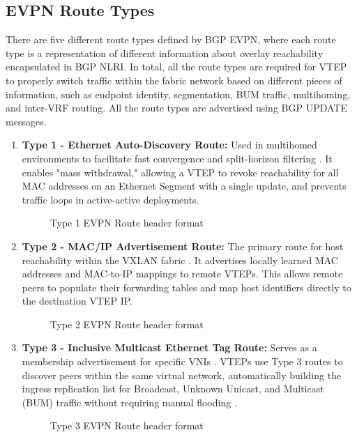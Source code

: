 \subsection{EVPN Route Types}
There are five different route types defined by BGP EVPN, where each route type is a representation of different information about overlay reachability encapsulated in BGP NLRI\cite{IETFRFC7365}. In total, all the route types are required for VTEP to properly switch traffic within the fabric network based on different pieces of information, such as endpoint identity, segmentation, BUM traffic, multihoming, and inter-VRF routing. All the route types are advertised using BGP UPDATE messages.

\begin{enumerate}
\item \textbf{Type 1 - Ethernet Auto-Discovery Route:}
Used in multihomed environments to facilitate fast convergence and split-horizon filtering \cite{IETFRFC7432}. It enables "mass withdrawal," allowing a VTEP to revoke reachability for all MAC addresses on an Ethernet Segment with a single update, and prevents traffic loops in active-active deployments.
\begin{figure}[!htbp]
\centering
\typeone
\caption{Type 1 EVPN Route header format}
\label{fig:type1-evpn}
\end{figure}

\item \textbf{Type 2 - MAC/IP Advertisement Route:}
The primary route for host reachability within the VXLAN fabric \cite{IETFRFC7432}. It advertises locally learned MAC addresses and MAC-to-IP mappings to remote VTEPs. This allows remote peers to populate their forwarding tables and map host identifiers directly to the destination VTEP IP.
\begin{figure}[!htbp]
    \centering
    \typetwo
    \caption{Type 2 EVPN Route header format}
    \label{fig:type2-evpn}
\end{figure}

\item \textbf{Type 3 - Inclusive Multicast Ethernet Tag Route:}
Serves as a membership advertisement for specific VNIs \cite{IETFRFC7432}. VTEPs use Type 3 routes to discover peers within the same virtual network, automatically building the ingress replication list for Broadcast, Unknown Unicast, and Multicast (BUM) traffic without requiring manual flooding \cite{IETFRFC8365}.
\begin{figure}[!htbp]
    \centering
    \typethree
    \caption{Type 3 EVPN Route header format}
    \label{fig:type3-evpn}
\end{figure}


\end{enumerate}
